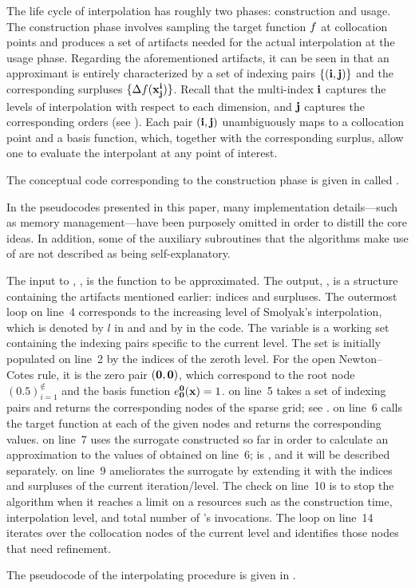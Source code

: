 The life cycle of interpolation has roughly two phases: construction and usage.
The construction phase involves sampling the target function $f$ at collocation
points and produces a set of artifacts needed for the actual interpolation at
the usage phase. Regarding the aforementioned artifacts, it can be seen in
 that an approximant is entirely characterized by a set
of indexing pairs $\{ (\mathbf{i}, \mathbf{j}) \}$ and the corresponding surpluses $\{
\Delta f(\mathbf{x}^{\mathbf{i}}_{\mathbf{j}}) \}$. Recall that the multi-index $\mathbf{i}$ captures the levels
of interpolation with respect to each dimension, and $\mathbf{j}$ captures the
corresponding orders (see ). Each pair $(\mathbf{i}, \mathbf{j})$
unambiguously maps to a collocation point and a basis function, which, together
with the corresponding surplus, allow one to evaluate the interpolant at any
point of interest.


The conceptual code corresponding to the construction phase is given in
 called .

\begin{remark}
In the pseudocodes presented in this paper, many implementation details---such
as memory management---have been purposely omitted in order to distill the core
ideas. In addition, some of the auxiliary subroutines that the algorithms make
use of are not described as being self-explanatory.
\end{remark}

The input to , , is the function to be
approximated. The output, , is a structure containing the
artifacts mentioned earlier: indices and surpluses. The outermost loop on line~4
corresponds to the increasing level of Smolyak's interpolation, which is denoted
by $l$ in  and  and by  in
the code. The  variable is a working set containing the indexing
pairs specific to the current level. The set is initially populated on line~2 by
the indices of the zeroth level. For the open Newton--Cotes rule, it is the zero
pair $(\mathbf{0}, \mathbf{0})$, which correspond to the root node $(0.5)_{i = 1}^\nin$
and the basis function $e^{\mathbf{0}}_{\mathbf{0}}(\mathbf{x}) = 1$.  on line~5
takes a set of indexing pairs and returns the corresponding nodes of the sparse
grid; see .  on line~6 calls the target
function at each of the given nodes and returns the corresponding values.
 on line~7 uses the surrogate constructed so far in order to
calculate an approximation to the values of  obtained on line~6;
 is , and it will be described separately.
 on line~9 ameliorates the surrogate by extending it with the
indices and surpluses of the current iteration/level. The check on line~10 is to
stop the algorithm when it reaches a limit on a resources such as the
construction time, interpolation level, and total number of 's
invocations. The loop on line~14 iterates over the collocation nodes of the
current level and identifies those nodes that need refinement.


The pseudocode of the interpolating procedure is given in .
